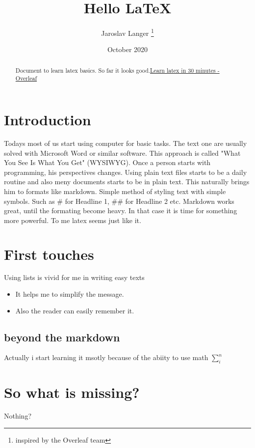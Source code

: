 \documentclass[12pt, letterpaper, twoside]{article}
\title{Hello \LaTeX{}}
\author{Jaroslav Langer \thanks{inspired by the Overleaf team}}
\date{October 2020}
\begin{document}
\maketitle

\tableofcontents


\begin{abstract}
Document to learn latex basics. So far it looks good.\href{https://www.overleaf.com/learn/latex/Learn_Latex_in_30_minutes}{Learn latex in 30 minutes - Overleaf}
\end{abstract}


\section{Introduction}

Todays most of us start using computer for basic tasks. The text one are usually solved with Microsoft Word or similar software. This approach is called "What You See Is What You Get" (WYSIWYG). Once a person starts with programming, his perspectives changes. Using plain text files starts to be a daily routine and also meny documents starts to be in plain text. This naturally brings him to formats like markdown. Simple method of styling text with simple symbols. Such as \# for Headline 1, \#\# for Headline 2 etc. Markdown works great, until the formating become heavy. In that case it is time for something more powerful. To me latex seems just like it. 

\section{First touches}

Using lists is vivid for me in writing easy texts

\begin{itemize}
    \item It helps me to simplify the message.
    \item Also the reader can easily remember it.
\end{itemize}

\subsection{beyond the markdown}

Actually i start learning it msotly because of the abiity to use math $ \sum^{n}_{i}  $

\section*{So what is missing?}

Nothing?
\end{document}
